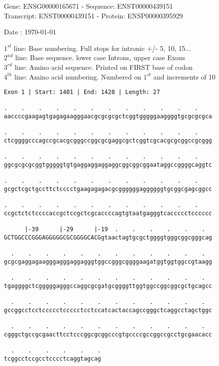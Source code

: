 \documentclass{article}
\begin{document}
\begin{center}
\begin{large}
Gene: ENSG00000165671 - Sequence: ENST00000439151\\
Transcript: ENST00000439151 - Protein: ENSP00000395929
 
 Date : \today
\end{large}
\end{center}
$1^{st}$ line: Base numbering. Full stops for intronic +/- 5, 10, 15...\\
$2^{nd}$ line: Base sequence. lower case Introns, upper case Exons\\
$3^{rd}$ line: Amino acid sequence. Printed on FIRST base of codon\\
$4^{th}$ line: Amino acid numbering. Numbered on $1^{st}$ and increments of 10\\
\begin{Verbatim}[fontfamily=courier]
Exon 1 | Start: 1401 | End: 1428 | Length: 27

.    .    .    .    .    .    .    .    .    .    .    .    
aaccccgaagagtgagagaagggaacgcgcgcgctcggtgggggaaggggtgcgcgcgca

.    .    .    .    .    .    .    .    .    .    .    .    
ctcggggcccagccgcacgcgggccggcgcgaggcgctcggtcgcacgcgcggccgcggg

.    .    .    .    .    .    .    .    .    .    .    .    
ggcgcgcgcggtgggggtgtgaggaggaggaggcggcggcggaataggccggggcaggtc

.    .    .    .    .    .    .    .    .    .    .    .    
gcgctcgctgccttctcccctgaagagagacgcggggggaggggggtgcggcgagcggcc

.    .    .    .    .    .    .    .    .    .    .    .    
ccgctctctccccaccgctccgctcgcaccccagtgtaatgagggtcaccccctcccccc

      |-39      |-29      |-19  .    .    .    .    .    .  
GCTGGCCCGGGAGGGGGCGCGGGGCACGgtaactagtgcgctggggtgggcggcgggcag

  .    .    .    .    .    .    .    .    .    .    .    .  
gcgcgaggagaagggagggaggagggtggccgggcggggaagatggtggtggccgtaagg

  .    .    .    .    .    .    .    .    .    .    .    .  
tgaggggctcgggggagggccaggcgcgatgcggggttggtggccggcggcgctgcagcc

  .    .    .    .    .    .    .    .    .    .    .    .  
gccggcctcctccccctccccctcctccatcactaccagccgggctcaggcctagctggc

  .    .    .    .    .    .    .    .    .    .    .    .  
cgggctgccgcgaacttcctcccggcgcggcccgtgccccgccggccgcctgcgaacacc

  .    .    .    .    .    .
tcggcctccgcctcccctcaggtagcag
\end{Verbatim}
\end{document}
